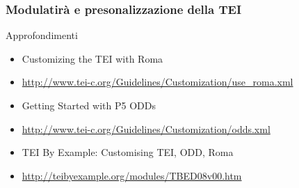 \begin{frame}
    \frametitle{Modulatirà e presonalizzazione della TEI}
    \addtocounter{nframe}{1}

    \begin{block}{Approfondimenti}
            \begin{itemize}
                \item Customizing the TEI with Roma
                \item [] \url{http://www.tei-c.org/Guidelines/Customization/use_roma.xml}
                \item Getting Started with P5 ODDs
                \item [] \url{http://www.tei-c.org/Guidelines/Customization/odds.xml}
                \item TEI By Example: Customising TEI, ODD, Roma
                \item [] \url{http://teibyexample.org/modules/TBED08v00.htm}
            \end{itemize} 
    \end{block}

\end{frame}
